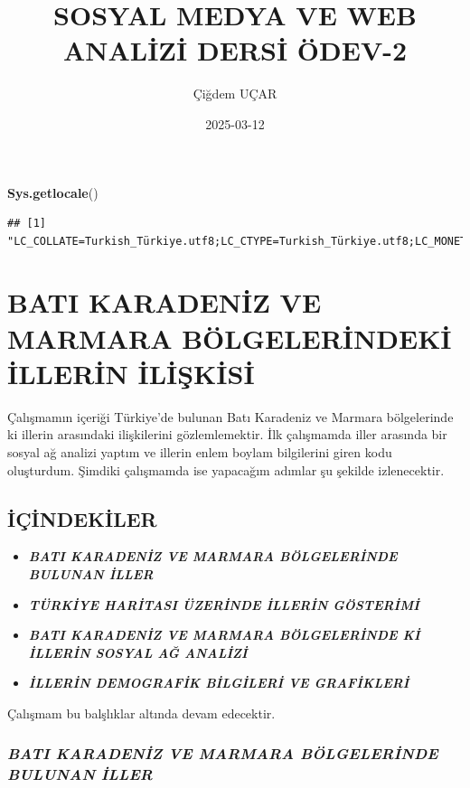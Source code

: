 \documentclass[
]{article}
\title{SOSYAL MEDYA VE WEB ANALİZİ DERSİ ÖDEV-2}
\author{Çiğdem UÇAR}
\date{2025-03-12}
\newenvironment{Shaded}{\begin{snugshade}}{\end{snugshade}}
\newcommand{\FunctionTok}[1]{\textcolor[rgb]{0.13,0.29,0.53}{\textbf{#1}}}
\newcommand{\NormalTok}[1]{#1}
\providecommand{\tightlist}{%
  \setlength{\itemsep}{0pt}\setlength{\parskip}{0pt}}
\begin{document}
\maketitle

\begin{Shaded}
\begin{Highlighting}[]
\FunctionTok{Sys.getlocale}\NormalTok{()}
\end{Highlighting}
\end{Shaded}

\begin{verbatim}
## [1] "LC_COLLATE=Turkish_Türkiye.utf8;LC_CTYPE=Turkish_Türkiye.utf8;LC_MONETARY=Turkish_Türkiye.utf8;LC_NUMERIC=C;LC_TIME=Turkish_Türkiye.utf8"
\end{verbatim}

\section{\texorpdfstring{\textbf{BATI KARADENİZ VE MARMARA
BÖLGELERİNDEKİ İLLERİN
İLİŞKİSİ}}{BATI KARADENİZ VE MARMARA BÖLGELERİNDEKİ İLLERİN İLİŞKİSİ}}\label{bati-karadeniz-ve-marmara-buxf6lgelerindeki-illerin-iliux15fkisi}

Çalışmamın içeriği Türkiye'de bulunan Batı Karadeniz ve Marmara
bölgelerinde ki illerin arasındaki ilişkilerini gözlemlemektir. İlk
çalışmamda iller arasında bir sosyal ağ analizi yaptım ve illerin enlem
boylam bilgilerini giren kodu oluşturdum. Şimdiki çalışmamda ise
yapacağım adımlar şu şekilde izlenecektir.

\subsection{İÇİNDEKİLER}\label{iuxe7indekiler}

\begin{itemize}
\tightlist
\item
  \textbf{\emph{BATI KARADENİZ VE MARMARA BÖLGELERİNDE BULUNAN İLLER }}
\item
  \textbf{\emph{TÜRKİYE HARİTASI ÜZERİNDE İLLERİN GÖSTERİMİ}}
\item
  \textbf{\emph{BATI KARADENİZ VE MARMARA BÖLGELERİNDE Kİ İLLERİN SOSYAL
  AĞ ANALİZİ }}
\item
  \textbf{\emph{İLLERİN DEMOGRAFİK BİLGİLERİ VE GRAFİKLERİ}}
\end{itemize}

Çalışmam bu balşlıklar altında devam edecektir.

\subsubsection{\texorpdfstring{\textbf{\emph{BATI KARADENİZ VE MARMARA
BÖLGELERİNDE BULUNAN İLLER
}}}{BATI KARADENİZ VE MARMARA BÖLGELERİNDE BULUNAN İLLER }}\label{bati-karadeniz-ve-marmara-buxf6lgelerinde-bulunan-iller}
\end{document}
